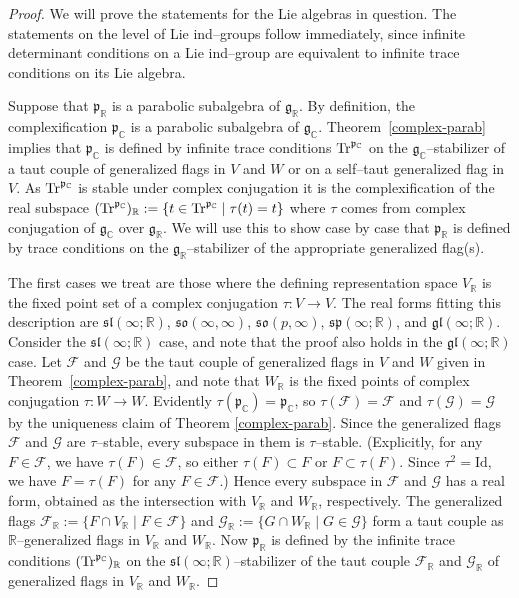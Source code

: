 \documentclass[oneside,leqno,11pt]{article}
\def\gg{\mathfrak{g}}
\def\ggl{\mathfrak{gl}}
\def\gp{\mathfrak{p}}
\def\gsl{\mathfrak{sl}}
\def\gso{\mathfrak{so}}
\def\gsp{\mathfrak{sp}}
\def\Tr{{\rm Tr}}
\def\C{\mathbb{C}}
\def\R{\mathbb{R}}
\def\cF{\mathcal{F}}
\def\cG{\mathcal{G}}
\begin{document}
\begin{proof}
We will prove the statements for the Lie algebras in question.  The statements on the level of Lie ind--groups follow immediately, since infinite determinant conditions on a Lie ind--group are equivalent to infinite trace conditions on its Lie algebra.  

Suppose that $\gp_\R$ is a parabolic subalgebra of $\gg_\R$.  By definition, the complexification $\gp_\C$ is a parabolic subalgebra of $\gg_\C$.  Theorem~\ref{complex-parab} implies that $\gp_\C$ is defined by infinite trace conditions $\Tr^{\gp_\C}$ on the $\gg_\C$--stabilizer of a taut couple of generalized flags in $V$ and $W$ or on a self--taut generalized flag in $V$.  As $\Tr^{\gp_\C}$
is stable under complex conjugation it is the complexification of the real subspace $(\Tr^{\gp_\C})_\R := \{t \in \Tr^{\gp_\C} \mid \tau(t) = t\}$ where
$\tau$ comes from complex conjugation of $\gg_\C$ over $\gg_\R$.  We will 
use this to show case by case that $\gp_\R$ is defined by trace conditions on the $\gg_\R$--stabilizer of the appropriate generalized flag(s).

The first cases we treat are those where the defining representation space
$V_\R$ is the fixed point set of a complex conjugation $\tau : V \to V$. 
The real forms fitting this description are
$\gsl(\infty;\R)$,
$\gso(\infty,\infty)$,
$\gso(p,\infty)$,
$\gsp(\infty;\R)$, and
$\ggl(\infty;\R)$.
Consider the $\gsl(\infty;\R)$ case, and note that the proof also holds in the $\ggl(\infty;\R)$ case. 
Let $\cF$ and $\cG$ be the taut couple of generalized flags in $V$ and $W$ given in Theorem~\ref{complex-parab}, and note that $W_\R$ is the fixed points of complex conjugation $\tau : W \to W$. Evidently $\tau(\gp_\C) = \gp_\C$, so $\tau(\cF) = \cF$ and $\tau(\cG) = \cG$ by the uniqueness claim of Theorem \ref{complex-parab}. 
Since the generalized flags $\cF$ and $\cG$ are $\tau$--stable, every subspace in them is $\tau$--stable.  (Explicitly, for any $F \in \cF$, we have $\tau (F) \in \cF$, so either $\tau (F) \subset F$ or $F \subset \tau (F)$.  Since $\tau^2 = \mathrm{Id}$, we have $F = \tau (F)$ for any $F \in \cF$.)  Hence every subspace in $\cF$ and $\cG$ has a real form, obtained as the intersection with $V_\R$ and $W_\R$, respectively.
The generalized flags $\cF_\R := \{ F \cap V_\R \mid F \in \cF \}$ and $\cG_\R := \{ G \cap W_\R \mid G \in \cG \}$ form a taut couple as $\R$--generalized flags in $V_\R$ and $W_\R$.  
Now $\gp_\R$ is defined by the infinite trace conditions $(\Tr^{\gp_\C})_\R$ on the $\gsl(\infty;\R)$--stabilizer of the taut couple $\cF_\R$ and $\cG_\R$ of generalized flags in $V_\R$ and $W_\R$.


\end{proof}
\end{document}
